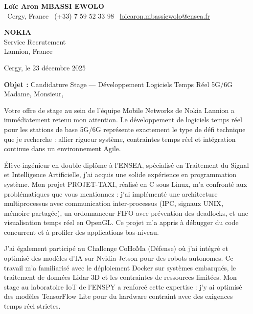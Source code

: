 \documentclass[a4paper,11pt]{article}
\begin{document}
\begin{center}
    {\Large \textbf{Loïc Aron MBASSI EWOLO}}\\[4pt]
    \small
    \faMapMarker\ Cergy, France \quad
    \faPhone\ (+33) 7 59 52 33 98 \quad
    \faEnvelope\ \href{mailto:loicaron.mbassiewolo@ensea.fr}{loicaron.mbassiewolo@ensea.fr}
\end{center}
\vspace{0.5cm}

\hfill
\begin{minipage}[t]{0.45\textwidth}
    \textbf{NOKIA}\\
    Service Recrutement\\
    Lannion, France
\end{minipage}

\vspace{0.8cm}

Cergy, le 23 décembre 2025

\vspace{0.5cm}

\textbf{Objet :} Candidature Stage — Développement Logiciels Temps Réel 5G/6G\\

Madame, Monsieur,

Votre offre de stage au sein de l'équipe Mobile Networks de Nokia Lannion a immédiatement retenu mon attention. Le développement de logiciels temps réel pour les stations de base 5G/6G représente exactement le type de défi technique que je recherche : allier rigueur système, contraintes temps réel et intégration continue dans un environnement Agile.

Élève-ingénieur en double diplôme à l'ENSEA, spécialisé en Traitement du Signal et Intelligence Artificielle, j'ai acquis une solide expérience en programmation système. Mon projet PROJET-TAXI, réalisé en C sous Linux, m'a confronté aux problématiques que vous mentionnez : j'ai implémenté une architecture multiprocessus avec communication inter-processus (IPC, signaux UNIX, mémoire partagée), un ordonnanceur FIFO avec prévention des deadlocks, et une visualisation temps réel en OpenGL. Ce projet m'a appris à débugger du code concurrent et à profiler des applications bas-niveau.

J'ai également participé au Challenge CoHoMa (Défense) où j'ai intégré et optimisé des modèles d'IA sur Nvidia Jetson pour des robots autonomes. Ce travail m'a familiarisé avec le déploiement Docker sur systèmes embarqués, le traitement de données Lidar 3D et les contraintes de ressources limitées. Mon stage au laboratoire IoT de l'ENSPY a renforcé cette expertise : j'y ai optimisé des modèles TensorFlow Lite pour du hardware contraint avec des exigences temps réel strictes.
\end{document}
